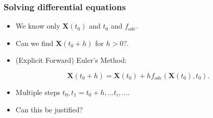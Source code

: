 \documentclass{beamer}
\begin{document}
\begin{frame}
\begin{columns}
\begin{column}{0.5\linewidth}
\frametitle{Solving differential equations}
\begin{itemize}

\item<1-> We know only $\mathbf{X}(t_0)$ and $t_0$ and $f_{ode}$.

\item<2-> Can we find $\mathbf{X}(t_0+h)$ for $h>0$?.

\item<3-> (Explicit Forward) Euler's Method:

\begin{equation*}
\mathbf{X}(t_0+h) = \mathbf{X}(t_0)+h f_{ode}(\mathbf{X}(t_0),t_0).
\end{equation*}

\item<3-> Multiple steps $t_0,t_1=t_0+h,\ldots t_i,\ldots$.

\item<4-> Can this be justified?


\end{itemize}
\end{column}
\end{columns}
\end{frame}
\end{document}
